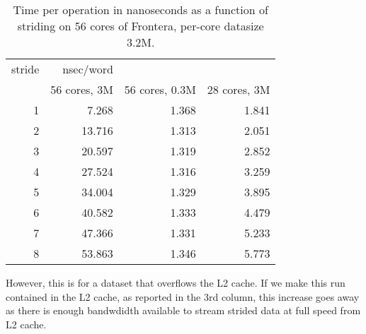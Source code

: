 \begin{table}
  \begin{tabular}{rrrr}
    \toprule
    stride&nsec/word&&\\
    &56 cores, 3M& 56 cores, 0.3M&28 cores, 3M\\
    \midrule
  1 &  7.268 & 1.368 & 1.841\\
  2 & 13.716 & 1.313 & 2.051\\
  3 & 20.597 & 1.319 & 2.852\\
  4 & 27.524 & 1.316 & 3.259\\
  5 & 34.004 & 1.329 & 3.895\\
  6 & 40.582 & 1.333 & 4.479\\
  7 & 47.366 & 1.331 & 5.233\\
  8 & 53.863 & 1.346 & 5.773\\
    \bottomrule
  \end{tabular}
  \caption{Time per operation in nanoseconds as a function of striding
    on 56 cores of Frontera, per-core datasize 3.2M.}
  \label{fig:strides-p56-k3200}
\end{table}

However, this is for a dataset that overflows the L2 cache.
If we make this run contained in the L2 cache,
as reported in the 3rd column,
this increase goes away as there is enough bandwdidth
available to stream strided data at full speed from L2 cache.

